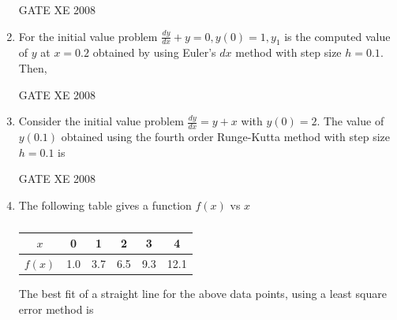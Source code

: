 \documentclass[12pt]{article}
\begin{document}
\begin{enumerate}
GATE XE 2008
\item  For the initial value problem\newline
$\frac{dy}{dx}+y=0 , y(0)=1 , y_{1}$  is the computed value of $y$ at $x = 0.2$ obtained by using Euler's $dx$ method with step size $h =0.1$. Then,

\begin{enumerate}
\end{enumerate}

GATE XE 2008
\item Consider the initial value problem\newline
$\frac{dy}{dx}=y+x$ with $y(0)=2$.\newline
The value of $y(0.1)$ obtained using the fourth order Runge-Kutta method with step size $h = 0.1$ is

\begin{enumerate}
\end{enumerate}

GATE XE 2008
\item The following table gives a function $f(x)$ vs $x$\newline
\begin{table}[H]     \centering     \caption{}     \label{}     \begin{tabular}{|c|c|c|c|c|c|}
\hline
    $x$ & 0 & 1 & 2 & 3 & 4 \\
    \hline
    $f(x)$ & 1.0 & 3.7 & 6.5 & 9.3 & 12.1\\
    \hline
\end{tabular} \end{table}
The best fit of a straight line for the above data points, using a least square error method is

\begin{enumerate}
\end{enumerate}


\end{enumerate}
\end{document}
